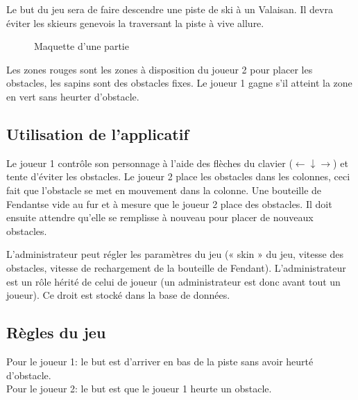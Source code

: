 \documentclass[a4paper,11pt]{article}
\begin{document}
	Le but du jeu sera de faire descendre une piste de ski à un Valaisan. Il devra éviter les skieurs genevois la traversant la piste à vive allure.


	\begin{figure}[h!]
		\centering
			\caption{Maquette d'une partie}
			\label{maquette}
	\end{figure}

	Les zones rouges sont les zones à disposition du joueur 2 pour placer les obstacles, les sapins sont des obstacles fixes. Le joueur 1 gagne s'il atteint la zone en vert sans heurter d'obstacle.

	\subsection{Utilisation de l'applicatif}
	Le joueur 1 contrôle son personnage à l'aide des flèches du clavier ($\leftarrow \downarrow \rightarrow$) et tente d'éviter les obstacles. Le joueur 2 place les obstacles dans les colonnes, ceci fait que l'obstacle se met en mouvement dans la colonne. Une bouteille de Fendant\texttrademark se vide au fur et à mesure que le joueur 2 place des obstacles. Il doit ensuite attendre qu'elle se remplisse à nouveau pour placer de nouveaux obstacles.\par

	L'administrateur peut régler les paramètres du jeu (« skin » du jeu, vitesse des obstacles, vitesse de rechargement de la bouteille de Fendant\texttrademark). L'administrateur est un rôle hérité de celui de joueur (un administrateur est donc avant tout un joueur). Ce droit est stocké dans la base de données.

	\subsection{Règles du jeu}
	Pour le joueur 1: le but est d'arriver en bas de la piste sans avoir heurté d'obstacle. \\
	Pour le joueur 2: le but est que le joueur 1 heurte un obstacle.
\end{document}
